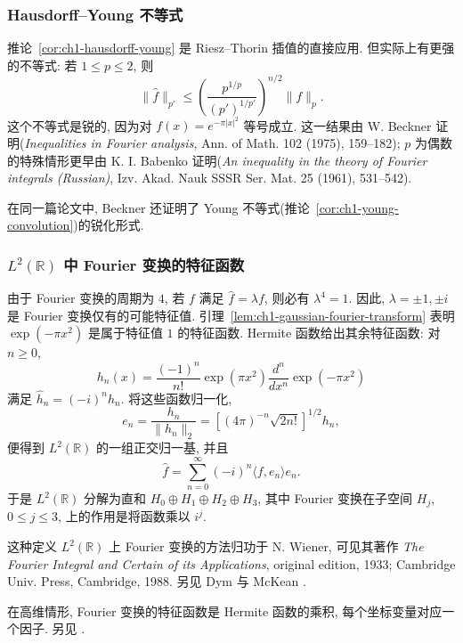 \subsubsection{Hausdorff--Young 不等式}
\label{subsec:ch1-sharp-hausdorff-young}

推论~\ref{cor:ch1-hausdorff-young} 是 Riesz--Thorin 插值的直接应用. 但实际上有更强的不等式: 若 $1\le p\le2$, 则
\[
 \|\widehat f\|_{p'}
 \le\left(\frac{p^{1/p}}{(p')^{1/p'}}\right)^{n/2}\|f\|_p.
\]
这个不等式是锐的, 因为对 $f(x)=e^{-\pi|x|^2}$ 等号成立. 这一结果由 W. Beckner 证明(\emph{Inequalities in Fourier analysis}, Ann. of Math. 102 (1975), 159--182); $p$ 为偶数的特殊情形更早由 K. I. Babenko 证明(\emph{An inequality in the theory of Fourier integrals (Russian)}, Izv. Akad. Nauk SSSR Ser. Mat. 25 (1961), 531--542).

\hypertarget{chapter-01-page-034}{}
在同一篇论文中, Beckner 还证明了 Young 不等式(推论~\ref{cor:ch1-young-convolution})的锐化形式.

\subsubsection{$L^2(\mathbb R)$ 中 Fourier 变换的特征函数}
\label{subsec:ch1-fourier-eigenfunctions}

由于 Fourier 变换的周期为 $4$, 若 $f$ 满足 $\widehat f=\lambda f$, 则必有 $\lambda^4=1$. 因此, $\lambda=\pm1,\pm i$ 是 Fourier 变换仅有的可能特征值. 引理~\ref{lem:ch1-gaussian-fourier-transform} 表明 $\exp(-\pi x^2)$ 是属于特征值 $1$ 的特征函数. Hermite 函数给出其余特征函数: 对 $n\ge0$,
\[
 h_n(x)=\frac{(-1)^n}{n!}\exp(\pi x^2)
 \frac{d^n}{dx^n}\exp(-\pi x^2)
\]
满足 $\widehat h_n=(-i)^nh_n$. 将这些函数归一化,
\[
 e_n=\frac{h_n}{\|h_n\|_2}
 =\left[(4\pi)^{-n}\sqrt{2n!}\right]^{1/2}h_n,
\]
便得到 $L^2(\mathbb R)$ 的一组正交归一基, 并且
\[
 \widehat f=\sum_{n=0}^{\infty}(-i)^n\langle f,e_n\rangle e_n.
\]
于是 $L^2(\mathbb R)$ 分解为直和 $H_0\oplus H_1\oplus H_2\oplus H_3$, 其中 Fourier 变换在子空间 $H_j$, $0\le j\le3$, 上的作用是将函数乘以 $i^j$.

这种定义 $L^2(\mathbb R)$ 上 Fourier 变换的方法归功于 N. Wiener, 可见其著作 \emph{The Fourier Integral and Certain of its Applications}, original edition, 1933; Cambridge Univ. Press, Cambridge, 1988. 另见 Dym 与 McKean .

在高维情形, Fourier 变换的特征函数是 Hermite 函数的乘积, 每个坐标变量对应一个因子. 另见 .

